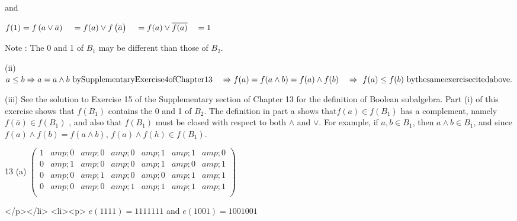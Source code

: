 and



 \(f(1) = f\left(a \lor  \bar{a}\right) \\
\\
\quad = f(a) \lor f\left(\overset{\text{}_{\_}}{a}\right) \\
\\
\quad = f(a) \lor  \overline{f(a)} \\
\\
\quad = 1\)



      Note : The 0 and 1 of \(B_1\) may be different than those of \(B_2\). 



(ii)  \(a\leq b\Rightarrow  a=a\land b\text{    }\text{by} \text{Supplementary} \text{Exercise} 4 \text{of} \text{Chapter} 13\\
\\
\quad \Rightarrow  f(a)=f(a\land b)=f(a)\land f(b)\\
\\
\quad \Rightarrow \text{  }f(a)\leq f(b)\text{   }\text{by} \text{the} \text{same} \text{exercise} \text{cited} \text{above}.\)



(iii) See the solution to Exercise 15 of the Supplementary section of Chapter 13 for the definition of Boolean subalgebra. Part (i) of this exercise
shows that \(f\left(B_1\right)\) contains the 0 and 1 of \(B_2\). The definition in part a shows that\(f(a) \in f\left(B_1\right)\) has a complement,
namely \(f\left(\bar{a}\right)\in f\left(B_1\right)\) , and also that \(f\left(B_1\right)\) must be closed with respect to both $\land $ and $\lor
$.  For example, if \(a, b \in B_1\), then \(a \land  b \in B_1\), and since \(f(a) \land f(b) = f(a \land  b)\),   \(f(a) \land f(h) \in f\left(B_1\right)\).




13 (a)    \(\left(
\begin{array}{ccccccc}
 1 &amp; 0 &amp; 0 &amp; 0 &amp; 1 &amp; 1 &amp; 0 \\
 0 &amp; 1 &amp; 0 &amp; 0 &amp; 1 &amp; 0 &amp; 1 \\
 0 &amp; 0 &amp; 1 &amp; 0 &amp; 0 &amp; 1 &amp; 1 \\
 0 &amp; 0 &amp; 0 &amp; 1 &amp; 1 &amp; 1 &amp; 1 \\
\end{array}
\right)\)

</p></li>
<li><p> \(e(1111) = 1111111\)   and \(e(1001) = 1001001\)

